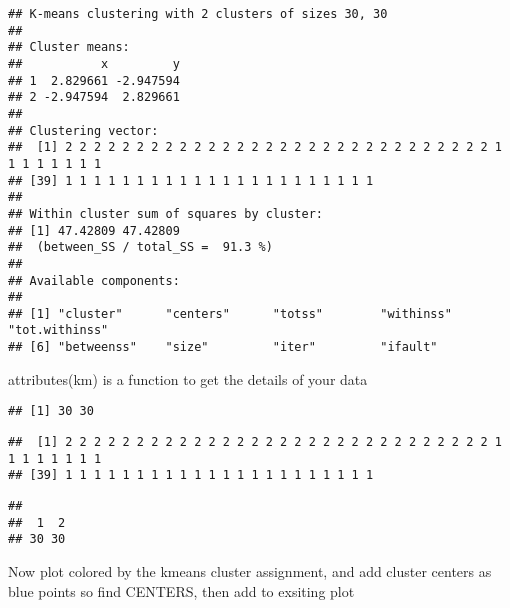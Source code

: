 \documentclass[]{article}
\newenvironment{Shaded}{\begin{snugshade}}{\end{snugshade}}
\newcommand{\KeywordTok}[1]{\textcolor[rgb]{0.13,0.29,0.53}{\textbf{#1}}}
\newcommand{\NormalTok}[1]{#1}
\newcommand{\OperatorTok}[1]{\textcolor[rgb]{0.81,0.36,0.00}{\textbf{#1}}}
\begin{document}
\begin{verbatim}
## K-means clustering with 2 clusters of sizes 30, 30
## 
## Cluster means:
##           x         y
## 1  2.829661 -2.947594
## 2 -2.947594  2.829661
## 
## Clustering vector:
##  [1] 2 2 2 2 2 2 2 2 2 2 2 2 2 2 2 2 2 2 2 2 2 2 2 2 2 2 2 2 2 2 1 1 1 1 1 1 1 1
## [39] 1 1 1 1 1 1 1 1 1 1 1 1 1 1 1 1 1 1 1 1 1 1
## 
## Within cluster sum of squares by cluster:
## [1] 47.42809 47.42809
##  (between_SS / total_SS =  91.3 %)
## 
## Available components:
## 
## [1] "cluster"      "centers"      "totss"        "withinss"     "tot.withinss"
## [6] "betweenss"    "size"         "iter"         "ifault"
\end{verbatim}

attributes(km) is a function to get the details of your data

\begin{Shaded}
\end{Shaded}

\begin{verbatim}
## [1] 30 30
\end{verbatim}

\begin{Shaded}
\end{Shaded}

\begin{verbatim}
##  [1] 2 2 2 2 2 2 2 2 2 2 2 2 2 2 2 2 2 2 2 2 2 2 2 2 2 2 2 2 2 2 1 1 1 1 1 1 1 1
## [39] 1 1 1 1 1 1 1 1 1 1 1 1 1 1 1 1 1 1 1 1 1 1
\end{verbatim}

\begin{Shaded}
\end{Shaded}

\begin{verbatim}
## 
##  1  2 
## 30 30
\end{verbatim}

Now plot colored by the kmeans cluster assignment, and add cluster
centers as blue points so find CENTERS, then add to exsiting plot
\end{document}
